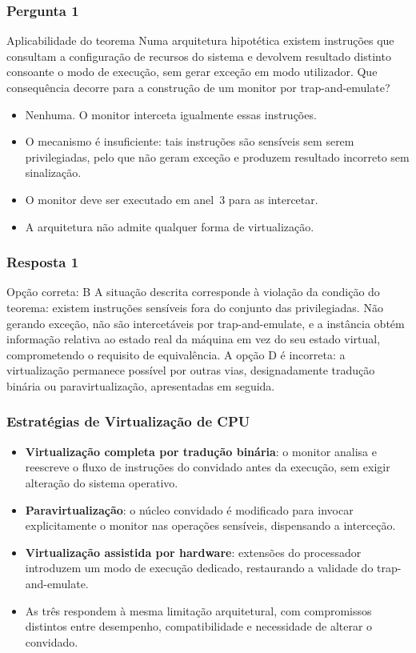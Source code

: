 \documentclass[aspectratio=169]{beamer}
\begin{document}
\begin{frame}
\frametitle{Pergunta 1}
\begin{pergunta}{Aplicabilidade do teorema}
Numa arquitetura hipotética existem instruções que consultam a configuração de recursos do sistema e devolvem resultado distinto consoante o modo de execução, sem gerar exceção em modo utilizador. Que consequência decorre para a construção de um monitor por trap-and-emulate?
\begin{itemize}
    \item[A)] Nenhuma. O monitor interceta igualmente essas instruções.
    \item[B)] O mecanismo é insuficiente: tais instruções são sensíveis sem serem privilegiadas, pelo que não geram exceção e produzem resultado incorreto sem sinalização.
    \item[C)] O monitor deve ser executado em anel~3 para as intercetar.
    \item[D)] A arquitetura não admite qualquer forma de virtualização.
\end{itemize}
\end{pergunta}
\end{frame}

\begin{frame}
\frametitle{Resposta 1}
\begin{resposta}{Opção correta: B}
A situação descrita corresponde à violação da condição do teorema: existem instruções sensíveis fora do conjunto das privilegiadas. Não gerando exceção, não são intercetáveis por trap-and-emulate, e a instância obtém informação relativa ao estado real da máquina em vez do seu estado virtual, comprometendo o requisito de equivalência. A opção D é incorreta: a virtualização permanece possível por outras vias, designadamente tradução binária ou paravirtualização, apresentadas em seguida.
\end{resposta}
\end{frame}

\begin{frame}
\frametitle{Estratégias de Virtualização de CPU}
\begin{itemize}
    \setlength\itemsep{0.4cm}
    \item \textbf{Virtualização completa por tradução binária}: o monitor analisa e reescreve o fluxo de instruções do convidado antes da execução, sem exigir alteração do sistema operativo.
    \item \textbf{Paravirtualização}: o núcleo convidado é modificado para invocar explicitamente o monitor nas operações sensíveis, dispensando a interceção.
    \item \textbf{Virtualização assistida por hardware}: extensões do processador introduzem um modo de execução dedicado, restaurando a validade do trap-and-emulate.
    \item As três respondem à mesma limitação arquitetural, com compromissos distintos entre desempenho, compatibilidade e necessidade de alterar o convidado.
\end{itemize}
\end{frame}
\end{document}
